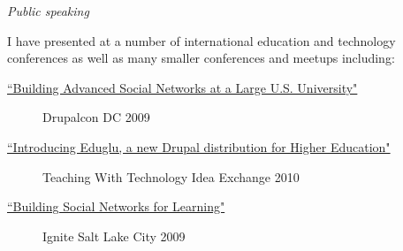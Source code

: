 \documentclass[11pt]{article}
\begin{document}
\bigskip

\noindent\emph{Public speaking}

\medskip

\noindent I have presented at a number of international education and technology conferences as well as many smaller conferences and meetups including:

\begin{description}
  \item[\href{http://www.archive.org/details/DrupalconDc2009-BuildingAdvancedSocialNetworksAtALargeU.s.University}{``Building Advanced Social Networks at a Large U.S. University"}] Drupalcon DC 2009
  \item[\href{http://ttix.org/archives/2010-sessions/introducing-eduglu-a-new-drupal-distribution-for-higher-education/}{``Introducing Eduglu, a new Drupal distribution for Higher Education"}] Teaching With Technology Idea Exchange 2010
  \item[\href{http://www.ignitesaltlake.com/ignite/index.cfm/videos/ignite-salt-lake-2/}{``Building Social Networks for Learning"}] Ignite Salt Lake City 2009
\end{description}
\end{document}
